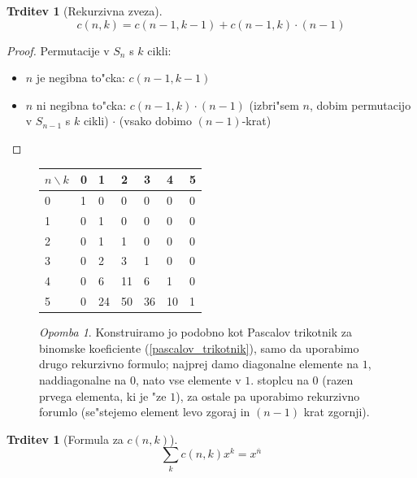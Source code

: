 \documentclass[a4paper,12pt]{article}
\theoremstyle{definition}
\newtheorem{claim}[counter]{Trditev}
\theoremstyle{remark}
\newtheorem*{rem}{Opomba}
\begin{document}
\begin{claim}[Rekurzivna zveza]
	\[c(n, k) = c(n-1, k-1) + c(n-1, k)\cdot(n-1)\]
\end{claim}

\begin{proof}
	Permutacije v $S_n$ s $k$ cikli:
	\begin{itemize}
	    \item $n$ je negibna to"cka: $c(n-1, k-1)$
	    \item $n$ ni negibna to"cka: $c(n-1, k)  \cdot (n-1)$ (izbri"sem $n$, dobim permutacijo v $S_{n-1}$ s $k$ cikli) $\cdot$ (vsako dobimo $(n-1)$-krat)
	\end{itemize}
\end{proof}


\begin{figure}
	\centering
	\begin{tabular}{l|llllll}
	    $n \backslash k$ & 0 & 1  & 2  & 3  & 4  & 5 \\
	    \hline
	    0 & 1 & 0  & 0  & 0  & 0  & 0 \\
	    1 & 0 & 1  & 0  & 0  & 0  & 0 \\
	    2 & 0 & 1  & 1  & 0  & 0  & 0 \\
	    3 & 0 & 2  & 3  & 1  & 0  & 0 \\
	    4 & 0 & 6  & 11 & 6  & 1  & 0 \\
	    5 & 0 & 24 & 50 & 36 & 10 & 1
	\end{tabular}
	\caption{Tabela Stirlingovih "stevil 1. vrste}
	\begin{rem}
		Konstruiramo jo podobno kot Pascalov trikotnik za binomske koeficiente (\ref{pascalov_trikotnik}), samo da uporabimo drugo rekurzivno formulo; najprej damo diagonalne elemente na $1$, naddiagonalne na $0$, nato vse elemente v $1$. stoplcu na 0 (razen prvega elementa, ki je "ze $1$), za ostale pa uporabimo rekurzivno forumlo (se"stejemo element levo zgoraj in $(n-1)$ krat zgornji). \label{konstrukcija_tabele}
	\end{rem}
\end{figure}

\begin{claim}[Formula za $c(n,k)$]\label{cnk_narascajoce}
    \[\sum_k c(n,k)x^k = x^{\overline{n}}\]
\end{claim}
\end{document}
